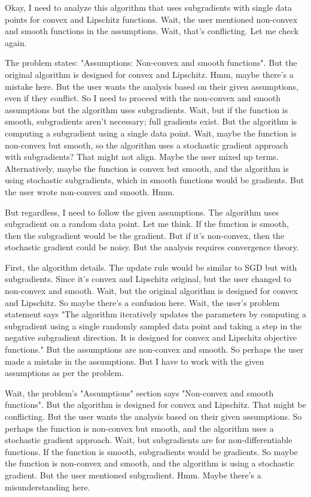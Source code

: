 Okay, I need to analyze this algorithm that uses subgradients with single data points for convex and Lipschitz functions. Wait, the user mentioned non-convex and smooth functions in the assumptions. Wait, that's conflicting. Let me check again.

The problem states: "Assumptions: Non-convex and smooth functions". But the original algorithm is designed for convex and Lipschitz. Hmm, maybe there's a mistake here. But the user wants the analysis based on their given assumptions, even if they conflict. So I need to proceed with the non-convex and smooth assumptions but the algorithm uses subgradients. Wait, but if the function is smooth, subgradients aren't necessary; full gradients exist. But the algorithm is computing a subgradient using a single data point. Wait, maybe the function is non-convex but smooth, so the algorithm uses a stochastic gradient approach with subgradients? That might not align. Maybe the user mixed up terms. Alternatively, maybe the function is convex but smooth, and the algorithm is using stochastic subgradients, which in smooth functions would be gradients. But the user wrote non-convex and smooth. Hmm.

But regardless, I need to follow the given assumptions. The algorithm uses subgradient on a random data point. Let me think. If the function is smooth, then the subgradient would be the gradient. But if it's non-convex, then the stochastic gradient could be noisy. But the analysis requires convergence theory.

First, the algorithm details. The update rule would be similar to SGD but with subgradients. Since it's convex and Lipschitz original, but the user changed to non-convex and smooth. Wait, but the original algorithm is designed for convex and Lipschitz. So maybe there's a confusion here. Wait, the user's problem statement says "The algorithm iteratively updates the parameters by computing a subgradient using a single randomly sampled data point and taking a step in the negative subgradient direction. It is designed for convex and Lipschitz objective functions." But the assumptions are non-convex and smooth. So perhaps the user made a mistake in the assumptions. But I have to work with the given assumptions as per the problem.

Wait, the problem's "Assumptions" section says "Non-convex and smooth functions". But the algorithm is designed for convex and Lipschitz. That might be conflicting. But the user wants the analysis based on their given assumptions. So perhaps the function is non-convex but smooth, and the algorithm uses a stochastic gradient approach. Wait, but subgradients are for non-differentiable functions. If the function is smooth, subgradients would be gradients. So maybe the function is non-convex and smooth, and the algorithm is using a stochastic gradient. But the user mentioned subgradient. Hmm. Maybe there's a misunderstanding here.

